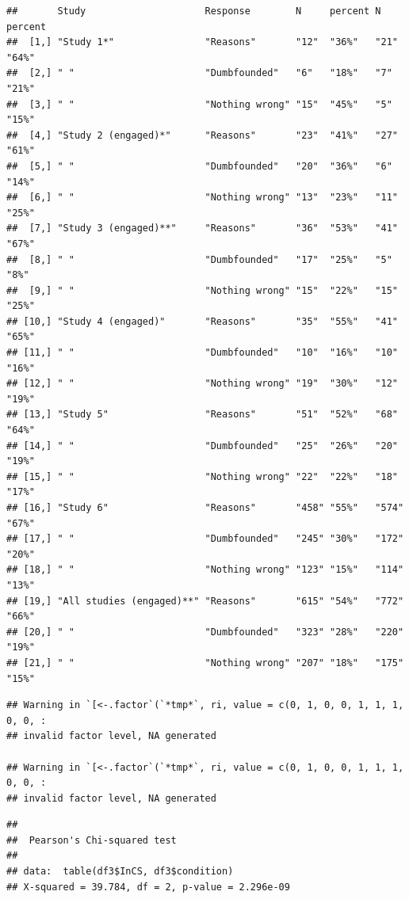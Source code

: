 \documentclass[
  american,
  man,floatsintext]{apa7}
\begin{document}
\begin{verbatim}
##       Study                     Response        N     percent N     percent
##  [1,] "Study 1*"                "Reasons"       "12"  "36%"   "21"  "64%"  
##  [2,] " "                       "Dumbfounded"   "6"   "18%"   "7"   "21%"  
##  [3,] " "                       "Nothing wrong" "15"  "45%"   "5"   "15%"  
##  [4,] "Study 2 (engaged)*"      "Reasons"       "23"  "41%"   "27"  "61%"  
##  [5,] " "                       "Dumbfounded"   "20"  "36%"   "6"   "14%"  
##  [6,] " "                       "Nothing wrong" "13"  "23%"   "11"  "25%"  
##  [7,] "Study 3 (engaged)**"     "Reasons"       "36"  "53%"   "41"  "67%"  
##  [8,] " "                       "Dumbfounded"   "17"  "25%"   "5"   "8%"   
##  [9,] " "                       "Nothing wrong" "15"  "22%"   "15"  "25%"  
## [10,] "Study 4 (engaged)"       "Reasons"       "35"  "55%"   "41"  "65%"  
## [11,] " "                       "Dumbfounded"   "10"  "16%"   "10"  "16%"  
## [12,] " "                       "Nothing wrong" "19"  "30%"   "12"  "19%"  
## [13,] "Study 5"                 "Reasons"       "51"  "52%"   "68"  "64%"  
## [14,] " "                       "Dumbfounded"   "25"  "26%"   "20"  "19%"  
## [15,] " "                       "Nothing wrong" "22"  "22%"   "18"  "17%"  
## [16,] "Study 6"                 "Reasons"       "458" "55%"   "574" "67%"  
## [17,] " "                       "Dumbfounded"   "245" "30%"   "172" "20%"  
## [18,] " "                       "Nothing wrong" "123" "15%"   "114" "13%"  
## [19,] "All studies (engaged)**" "Reasons"       "615" "54%"   "772" "66%"  
## [20,] " "                       "Dumbfounded"   "323" "28%"   "220" "19%"  
## [21,] " "                       "Nothing wrong" "207" "18%"   "175" "15%"
\end{verbatim}

\begin{verbatim}
## Warning in `[<-.factor`(`*tmp*`, ri, value = c(0, 1, 0, 0, 1, 1, 1, 0, 0, :
## invalid factor level, NA generated

## Warning in `[<-.factor`(`*tmp*`, ri, value = c(0, 1, 0, 0, 1, 1, 1, 0, 0, :
## invalid factor level, NA generated
\end{verbatim}

\begin{verbatim}
## 
##  Pearson's Chi-squared test
## 
## data:  table(df3$InCS, df3$condition)
## X-squared = 39.784, df = 2, p-value = 2.296e-09
\end{verbatim}
\end{document}
